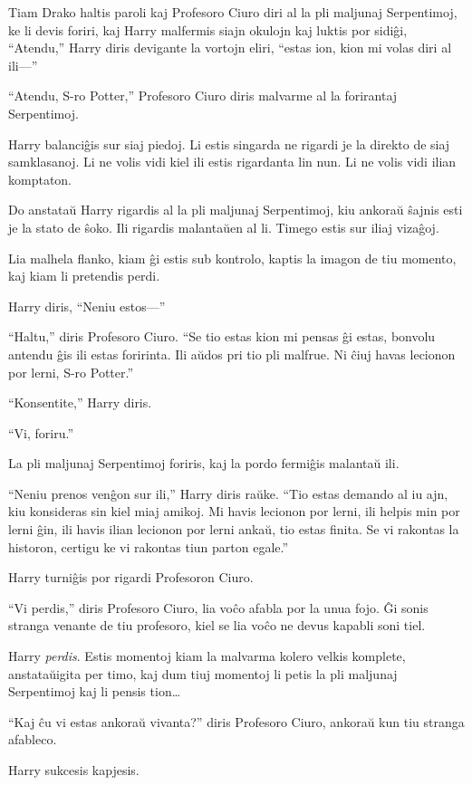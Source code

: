 Tiam Drako haltis paroli kaj Profesoro Ciuro diri al la pli maljunaj
Serpentimoj, ke li devis foriri, kaj Harry malfermis siajn okulojn kaj
luktis por sidiĝi, ``Atendu,'' Harry diris devigante la vortojn eliri,
``estas ion, kion mi volas diri al ili—''

``Atendu, S-ro Potter,'' Profesoro Ciuro diris malvarme al la forirantaj Serpentimoj.

Harry balanciĝis sur siaj piedoj. Li estis singarda ne rigardi je la
direkto de siaj samklasanoj. Li ne volis vidi kiel ili estis
rigardanta lin nun. Li ne volis vidi ilian komptaton.

Do anstataŭ Harry rigardis al la pli maljunaj Serpentimoj, kiu ankoraŭ
ŝajnis esti je la stato de ŝoko. Ili rigardis malantaŭen al li. Timego
estis sur iliaj vizaĝoj.

Lia malhela flanko, kiam ĝi estis sub kontrolo, kaptis la imagon de tiu momento, kaj kiam li pretendis perdi.

Harry diris, ``Neniu estos—''

``Haltu,'' diris Profesoro Ciuro. ``Se tio estas kion mi pensas ĝi
estas, bonvolu antendu ĝis ili estas foririnta. Ili aŭdos pri tio pli
malfrue. Ni ĉiuj havas lecionon por lerni, S-ro Potter.''

``Konsentite,'' Harry diris.

``Vi, foriru.''

La pli maljunaj Serpentimoj foriris, kaj la pordo fermiĝis malantaŭ ili.

``Neniu prenos venĝon sur ili,'' Harry diris raŭke.  ``Tio estas
demando al iu ajn, kiu konsideras sin kiel miaj amikoj. Mi havis
lecionon por lerni, ili helpis min por lerni ĝin, ili havis ilian
lecionon por lerni ankaŭ, tio estas finita. Se vi rakontas la
historon, certigu ke vi rakontas tiun parton egale.''


Harry turniĝis por rigardi Profesoron Ciuro.

``Vi perdis,'' diris Profesoro Ciuro, lia voĉo afabla por la unua
fojo. Ĝi sonis stranga venante de tiu profesoro, kiel se lia voĉo ne
devus kapabli soni tiel.

Harry \emph{perdis}. Estis momentoj kiam la malvarma kolero velkis
komplete, anstataŭigita per timo, kaj dum tiuj momentoj li petis la
pli maljunaj Serpentimoj kaj li pensis tion\ldots

``Kaj ĉu vi estas ankoraŭ vivanta?'' diris Profesoro Ciuro, ankoraŭ kun tiu stranga afableco.

Harry sukcesis kapjesis.

